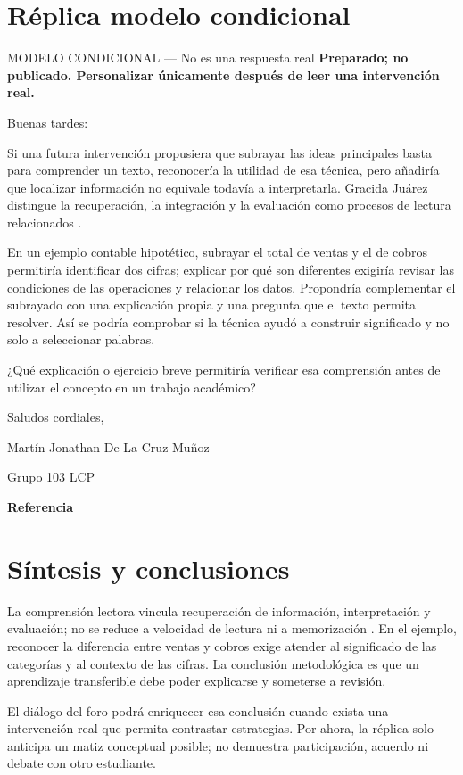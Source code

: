 \section{Réplica modelo condicional}
\begin{forobox}{MODELO CONDICIONAL — No es una respuesta real}
\textbf{Preparado; no publicado. Personalizar únicamente después de leer una intervención real.}

Buenas tardes:

Si una futura intervención propusiera que subrayar las ideas principales basta para comprender un texto, reconocería la utilidad de esa técnica, pero añadiría que localizar información no equivale todavía a interpretarla. Gracida Juárez distingue la recuperación, la integración y la evaluación como procesos de lectura relacionados \parencite[4]{gracida2012}.

En un ejemplo contable hipotético, subrayar el total de ventas y el de cobros permitiría identificar dos cifras; explicar por qué son diferentes exigiría revisar las condiciones de las operaciones y relacionar los datos. Propondría complementar el subrayado con una explicación propia y una pregunta que el texto permita resolver. Así se podría comprobar si la técnica ayudó a construir significado y no solo a seleccionar palabras.

¿Qué explicación o ejercicio breve permitiría verificar esa comprensión antes de utilizar el concepto en un trabajo académico?

Saludos cordiales,\par
Martín Jonathan De La Cruz Muñoz\par
Grupo 103 LCP

\textbf{Referencia}
\end{forobox}

\section{Síntesis y conclusiones}
La comprensión lectora vincula recuperación de información, interpretación y evaluación; no se reduce a velocidad de lectura ni a memorización \parencite[4]{gracida2012}. En el ejemplo, reconocer la diferencia entre ventas y cobros exige atender al significado de las categorías y al contexto de las cifras. La conclusión metodológica es que un aprendizaje transferible debe poder explicarse y someterse a revisión.

El diálogo del foro podrá enriquecer esa conclusión cuando exista una intervención real que permita contrastar estrategias. Por ahora, la réplica solo anticipa un matiz conceptual posible; no demuestra participación, acuerdo ni debate con otro estudiante.

